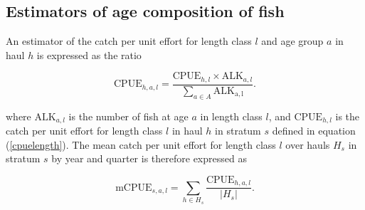 \documentclass[a4paper 12pt]{article}
\numberwithin{equation}{section}
\begin{document}
%
%
%





\subsection{Estimators of age composition of fish}
\label{agecom}

An estimator of the catch per unit effort for length class $l$ and age group $a$ in haul $h$ is expressed as the ratio

\begin{equation}
\mathrm{CPUE}_{h,a,l} =  \displaystyle \frac{\mathrm{CPUE}_{h,l} \times \mathrm{ALK}_{a,l}}{\displaystyle \sum\limits_{a \in A} \mathrm{ALK_{a,l}}}.
\label{cpueage}
\end{equation}

\noindent where $\mathrm{ALK}_{a,l} $ is the number of fish at age $a$ in length class $l$, and $\mathrm{CPUE}_{h,l} $ is the catch per unit effort for length class $l$ in haul $h$ in stratum $s$ defined in equation (\ref{cpuelength}). The mean catch per unit effort for length class $l$ over hauls $H_{s}$ in stratum $s$ by year and quarter is therefore expressed as 

 \begin{equation}
\mathrm{mCPUE}_{s,a,l} = \sum\limits_{h \in H_{s}} \frac{\mathrm{CPUE}_{h,a,l}}{|H_{s}|}.
\label{mcpueage}
\end{equation} 
\end{document}
